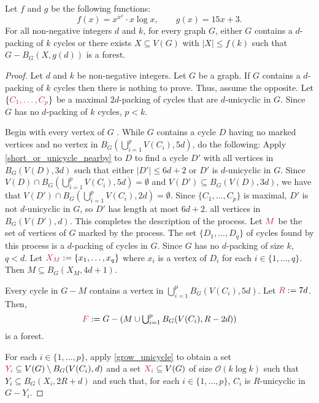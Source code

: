 \documentclass{patmorin}
\newcommand{\Oh}{\mathcal{O}}
\DeclarePairedDelimiter\set{\{}{\}}
\begin{document}
\begin{thm}\label{thm:the-big-ball-of-wax}
Let $f$ and $g$ be the following functions:
\[
f(x)= x^{x^x}\cdot x\log x,\qquad
g(x)= 15x +3.
\]
For all non-negative integers $d$ and $k$, for every graph $G$,
either $G$ contains a $d$-packing of $k$ cycles or
there exists $X\subseteq V(G)$ with $|X|\leq f(k)$ such that
$G-B_G(X,g(d))$ is a forest.
\end{thm}

\begin{proof}
Let $d$ and $k$ be non-negative integers.
Let $G$ be a graph.
If $G$ contains a $d$-packing of $k$ cycles then there is nothing to prove.
Thus, assume the opposite.
Let $\set{\mathdefin{C_1,\ldots,C_p}}$ be a maximal $2d$-packing of cycles that are $d$-unicyclic in $G$.  Since $G$ has no $d$-packing of $k$ cycles, $p<k$.

Begin with every vertex of $G$ .  While $G$ contains a cycle $D$ having no marked vertices and no vertex in $B_G(\bigcup_{i=1}^p V(C_i),5d)$, do the following:  Apply \cref{short_or_unicycle_nearby} to $D$ to find a cycle $D'$ with all vertices in  $B_G(V(D),3d)$ such that either $|D'|\leq 6d+2$ or $D'$ is $d$-unicyclic in $G$. Since $V(D)\cap B_G(\bigcup_{i=1}^p V(C_i),5d)=\emptyset$ and $V(D')\subseteq B_G(V(D),3d)$, we have that $V(D')\cap B_G(\bigcup_{i=1}^p V(C_i),2d)=\emptyset$. Since $\{C_1,\ldots,C_p\}$ is maximal, $D'$ is not $d$-unicyclic in $G$, so $D'$ has length at most $6d+2$.   all vertices in $B_G(V(D'),d)$.
This completes the description of the process.  Let $\mathdefin{M}$ be the set of vertices of $G$ marked by the process.  The set $\{D_1,\ldots,D_{q}\}$ of cycles found by this process is a $d$-packing of cycles in $G$.  Since $G$ has no $d$-packing of size $k$, $q<d$. Let $\mathdefin{X_M}:=\{x_1,\ldots,x_{q}\}$ where  $x_i$ is a vertex of $D_i$ for each $i\in\{1,\ldots,q\}$. Then $M\subseteq B_G(X_M,4d+1)$.

Every cycle in $G-M$ contains a vertex in $\bigcup_{i=1}^p B_G(V(C_i),5d)$.
Let $\mathdefin{R}:=7d$.
Then,
\[
\textstyle\mathdefin{F}:=G-\left(M\cup \bigcup_{i=1}^p B_G(V(C_i),R-2d)\right)
\]
is a forest.


For each $i\in\{1,\ldots,p\}$, apply \cref{grow_unicycle} to obtain a set $\mathdefin{Y_i}\subseteq V(G)\setminus B_G(V(C_i),d)$ and a set $\mathdefin{X_i}\subseteq V(G)$ of size $\Oh(k\log k)$ such that $Y_i\subseteq B_G(X_i,2R+d)$ and such that, for each $i\in\{1,\ldots,p\}$, $C_i$ is $R$-unicyclic in $G-Y_i$.


\end{proof}
\end{document}
